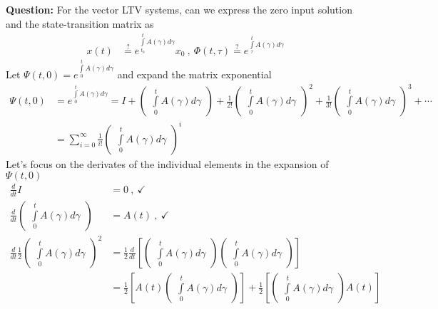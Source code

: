 \documentclass[twoside]{article}
\begin{document}
\textbf{Question:} For the vector LTV systems, can we express the zero input solution and the state-transition matrix as
%
\begin{align*}
x(t) &\overset{?}{=}  e^{ \int\limits_{t_0}^{t} A(\gamma) d\gamma  }  x_0 \ , \ \Phi(t,\tau) \overset{?}{=}  e^{ \int\limits_{\tau}^{t} A(\gamma) d\gamma  } 
\end{align*}
%
Let $\Psi(t,0) = e^{ \int\limits_{0}^{t} A(\gamma) d\gamma  } $ and expand the matrix exponential 
%
\begin{align*}
\Psi(t,0) &= e^{ \int\limits_{0}^{t} A(\gamma) d\gamma }  = I + \begin{pmatrix} \int\limits_{0}^{t} A(\gamma) d\gamma \end{pmatrix} + \frac{1}{2 !} \begin{pmatrix} \int\limits_{0}^{t} A(\gamma) d\gamma \end{pmatrix}^2  
+ \frac{1}{3 !} \begin{pmatrix} \int\limits_{0}^{t} A(\gamma) d\gamma \end{pmatrix}^3  + \cdots 
\\ 
&= \sum\limits_{i=0}^{\infty} \frac{1}{i !} \begin{pmatrix} \int\limits_{0}^{t} A(\gamma) d\gamma \end{pmatrix}^i  
\end{align*}
%
Let's focus on the derivates of the individual elements in the expansion of $\Psi(t,0)$
%
\begin{align*}
\frac{d}{dt} I &= 0 \ , \ \checkmark
\\
\frac{d}{dt}  \begin{pmatrix} \int\limits_{0}^{t} A(\gamma) d\gamma \end{pmatrix} &= A(t) \ , \ \checkmark
\\
\frac{d}{dt} \frac{1}{2}  \begin{pmatrix} \int\limits_{0}^{t} A(\gamma) d\gamma \end{pmatrix}^2 &= \frac{1}{2} \frac{d}{dt} \left[  \begin{pmatrix} \int\limits_{0}^{t} A(\gamma) d\gamma \end{pmatrix}  \begin{pmatrix} \int\limits_{0}^{t} A(\gamma) d\gamma \end{pmatrix} \right] \\
&= \frac{1}{2} \left[ A(t) \begin{pmatrix} \int\limits_{0}^{t} A(\gamma) d\gamma \end{pmatrix} \right] 
+  \frac{1}{2} \left[ \begin{pmatrix} \int\limits_{0}^{t} A(\gamma) d\gamma \end{pmatrix} A(t) \right] 
\end{align*}
\end{document}
